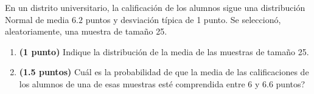 
En un distrito universitario, la calificación de los alumnos sigue una distribución Normal de media $6.2$ puntos y desviación típica de 1 punto. Se seleccionó, aleatoriamente, una muestra de tamaño 25.
\begin{enumerate}[label=\alph*)]
\item \textbf{(1 punto)} Indique la distribución de la media de las muestras de tamaño 25.
\item \textbf{(1.5 puntos)} \textquestiondown{}Cuál es la probabilidad de que la media de las calificaciones de los alumnos de una de esas muestras esté comprendida entre 6 y $6.6$ puntos?
\end{enumerate}
